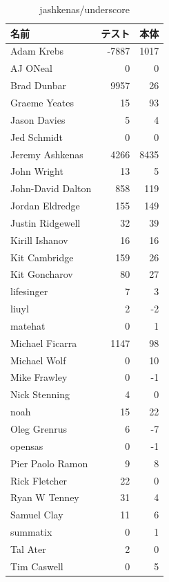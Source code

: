\begin{table}[htb]
\begin{center}
\caption{jashkenas/underscore}
\begin{tabular}{|l|r|r|} \hline 
名前 & テスト & 本体 \\ \hline \hline
Adam Krebs & -7887 & 1017\\ \hline
AJ ONeal & 0 & 0\\ \hline
Brad Dunbar & 9957 & 26\\ \hline
Graeme Yeates & 15 & 93\\ \hline
Jason Davies & 5 & 4\\ \hline
Jed Schmidt & 0 & 0\\ \hline
Jeremy Ashkenas & 4266 & 8435\\ \hline
John Wright & 13 & 5\\ \hline
John-David Dalton & 858 & 119\\ \hline
Jordan Eldredge & 155 & 149\\ \hline
Justin Ridgewell & 32 & 39\\ \hline
Kirill Ishanov & 16 & 16\\ \hline
Kit Cambridge & 159 & 26\\ \hline
Kit Goncharov & 80 & 27\\ \hline
lifesinger & 7 & 3\\ \hline
liuyl & 2 & -2\\ \hline
matehat & 0 & 1\\ \hline
Michael Ficarra & 1147 & 98\\ \hline
Michael Wolf & 0 & 10\\ \hline
Mike Frawley & 0 & -1\\ \hline
Nick Stenning & 4 & 0\\ \hline
noah & 15 & 22\\ \hline
Oleg Grenrus & 6 & -7\\ \hline
opensas & 0 & -1\\ \hline
Pier Paolo Ramon & 9 & 8\\ \hline
Rick Fletcher & 22 & 0\\ \hline
Ryan W Tenney & 31 & 4\\ \hline
Samuel Clay & 11 & 6\\ \hline
summatix & 0 & 1\\ \hline
Tal Ater & 2 & 0\\ \hline
Tim Caswell & 0 & 5\\ \hline
\end{tabular}
\end{center}
\end{table}

